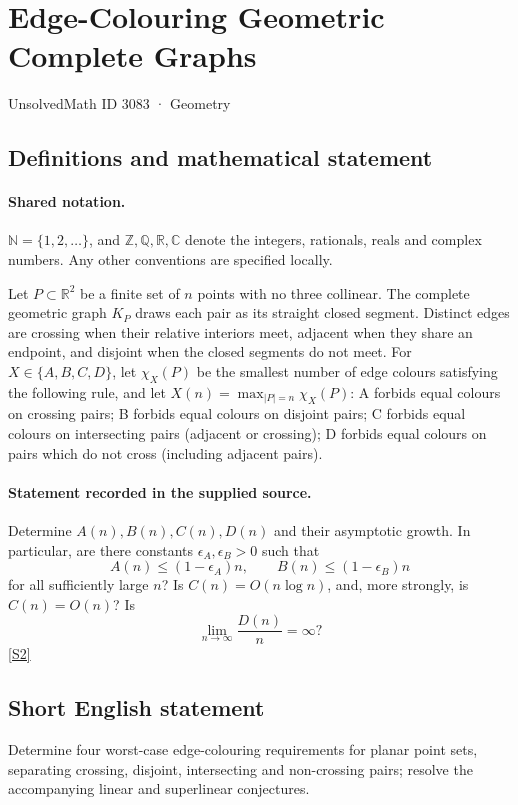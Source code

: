 \documentclass[11pt]{book}
\newcommand{\sref}[2]{\hyperlink{source:#1:#2}{[S#2]}}
\begin{document}
\setcounter{section}{3082}
\section{Edge-Colouring Geometric Complete Graphs}\label{3083}
{\small\sffamily UnsolvedMath ID 3083 · Geometry}
\subsection{Definitions and mathematical statement}

\paragraph{Shared notation.}$\mathbb N=\{1,2,\ldots\}$, and $\mathbb Z,\mathbb Q,\mathbb R,\mathbb C$ denote the integers, rationals, reals and complex numbers. Any other conventions are specified locally.


Let $P\subset\mathbb R^2$ be a finite set of $n$ points with no three collinear. The complete geometric graph $K_P$ draws each pair as its straight closed segment. Distinct edges are crossing when their relative interiors meet, adjacent when they share an endpoint, and disjoint when the closed segments do not meet. For $X\in\{A,B,C,D\}$, let $\chi_X(P)$ be the smallest number of edge colours satisfying the following rule, and let $X(n)=\max_{|P|=n}\chi_X(P)$: A forbids equal colours on crossing pairs; B forbids equal colours on disjoint pairs; C forbids equal colours on intersecting pairs (adjacent or crossing); D forbids equal colours on pairs which do not cross (including adjacent pairs).
\paragraph{Statement recorded in the supplied source.}
Determine $A(n),B(n),C(n),D(n)$ and their asymptotic growth. In particular, are there constants $\epsilon_A,\epsilon_B>0$ such that
\[A(n)\leq(1-\epsilon_A)n,\qquad B(n)\leq(1-\epsilon_B)n\]
for all sufficiently large $n$? Is $C(n)=O(n\log n)$, and, more strongly, is $C(n)=O(n)$? Is
\[\lim_{n\to\infty}\frac{D(n)}n=\infty?\] \sref{3083}{2}
\subsection{Short English statement}
Determine four worst-case edge-colouring requirements for planar point sets, separating crossing, disjoint, intersecting and non-crossing pairs; resolve the accompanying linear and superlinear conjectures.
\end{document}
